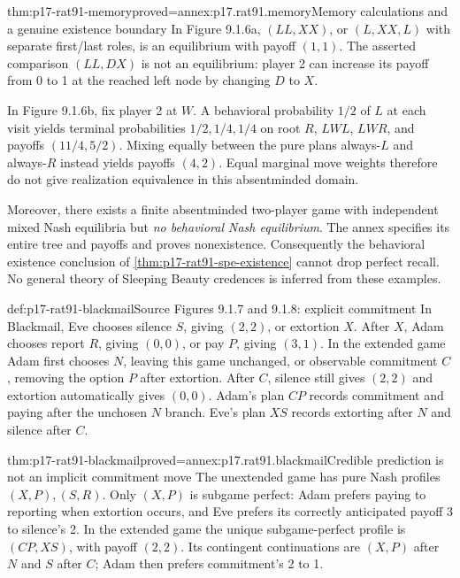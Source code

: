 \begin{hbtheorem}{thm:p17-rat91-memory}{proved=annex:p17.rat91.memory}{Memory calculations and a genuine existence boundary}
In Figure 9.1.6a, \((LL,XX)\), or \((L,XX,L)\) with separate
first/last roles, is an equilibrium with payoff \((1,1)\).
The asserted comparison \((LL,DX)\) is not an equilibrium:
player 2 can increase its payoff from 0 to 1 at the reached left
node by changing \(D\) to \(X\).

In Figure 9.1.6b, fix player 2 at \(W\). A behavioral probability
\(1/2\) of \(L\) at each visit yields terminal probabilities
\(1/2,1/4,1/4\) on root \(R\), \(LWL\), \(LWR\),
and payoffs \((11/4,5/2)\). Mixing equally between the pure
plans always-\(L\) and always-\(R\) instead yields payoffs
\((4,2)\). Equal marginal move weights therefore do not give
realization equivalence in this absentminded domain.

Moreover, there exists a finite absentminded two-player game with
independent mixed Nash equilibria but \emph{no behavioral Nash
equilibrium}. The annex specifies its entire tree and payoffs and
proves nonexistence. Consequently the behavioral existence conclusion
of \cref{thm:p17-rat91-spe-existence} cannot drop perfect recall.
No general theory of Sleeping Beauty credences is inferred from these
examples.
\end{hbtheorem}

\begin{hbdefinition}{def:p17-rat91-blackmail}{Source Figures 9.1.7 and 9.1.8: explicit commitment}
In Blackmail, Eve chooses silence \(S\), giving \((2,2)\), or
extortion \(X\). After \(X\), Adam chooses report \(R\),
giving \((0,0)\), or pay \(P\), giving \((3,1)\).
In the extended game Adam first chooses \(N\), leaving this game
unchanged, or observable commitment \(C\), removing the option
\(P\) after extortion. After \(C\), silence still gives \((2,2)\)
and extortion automatically gives \((0,0)\).
Adam's plan \(CP\) records commitment and paying after the unchosen
\(N\) branch. Eve's plan \(XS\) records extorting after \(N\)
and silence after \(C\).
\end{hbdefinition}

\begin{hbtheorem}{thm:p17-rat91-blackmail}{proved=annex:p17.rat91.blackmail}{Credible prediction is not an implicit commitment move}
The unextended game has pure Nash profiles \((X,P),(S,R)\).
Only \((X,P)\) is subgame perfect: Adam prefers paying to reporting
when extortion occurs, and Eve prefers its correctly anticipated
payoff 3 to silence's 2. In the extended game the unique
subgame-perfect profile is \((CP,XS)\), with payoff \((2,2)\).
Its contingent continuations are \((X,P)\) after \(N\) and
\(S\) after \(C\); Adam then prefers commitment's 2 to 1.
\end{hbtheorem}

